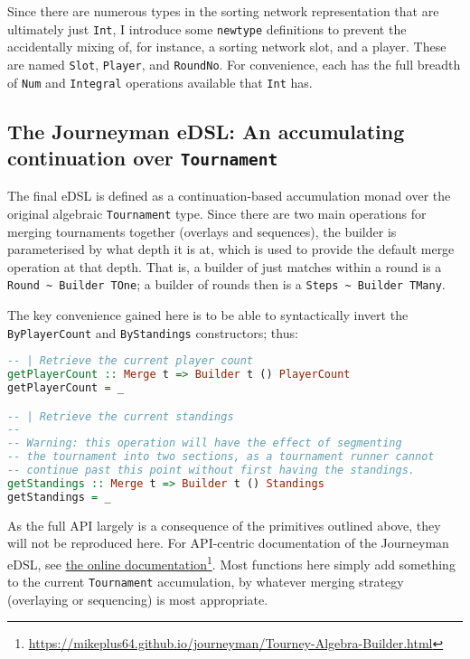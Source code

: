 \documentclass[a4,11pt,twoside,final,hidelinks]{article}
\begin{document}
Since there are numerous types in the sorting network representation that are
ultimately just \texttt{Int}, I introduce some \texttt{newtype} definitions to prevent the
accidentally mixing of, for instance, a sorting network slot, and a player.
These are named \texttt{Slot}, \texttt{Player}, and \texttt{RoundNo}. For convenience, each has the full
breadth of \texttt{Num} and \texttt{Integral} operations available that \texttt{Int} has.

\newpage
\subsection{The Journeyman eDSL: An accumulating continuation over \texttt{Tournament}}
\label{sec:org95bece4}

The final eDSL is defined as a continuation-based accumulation monad over the
original algebraic \texttt{Tournament} type. Since there are two main operations for
merging tournaments together (overlays and sequences), the builder is
parameterised by what depth it is at, which is used to provide the default merge
operation at that depth. That is, a builder of just matches within a round is a
\texttt{Round \textasciitilde{} Builder TOne}; a builder of rounds then is a \texttt{Steps \textasciitilde{} Builder TMany}.

The key convenience gained here is to be able to syntactically invert the
\texttt{ByPlayerCount} and \texttt{ByStandings} constructors; thus:

\begin{lstlisting}[language=haskell,numbers=none]
-- | Retrieve the current player count
getPlayerCount :: Merge t => Builder t () PlayerCount
getPlayerCount = _

-- | Retrieve the current standings
--
-- Warning: this operation will have the effect of segmenting
-- the tournament into two sections, as a tournament runner cannot
-- continue past this point without first having the standings.
getStandings :: Merge t => Builder t () Standings
getStandings = _
\end{lstlisting}

As the full API largely is a consequence of the primitives outlined above, they
will not be reproduced here. For API-centric documentation of the Journeyman
eDSL, see
\href{https://mikeplus64.github.io/journeyman/Tourney-Algebra-Builder.html}{ the online documentation}\footnote{\url{https://mikeplus64.github.io/journeyman/Tourney-Algebra-Builder.html}}. Most functions here simply add something to the current
\texttt{Tournament} accumulation, by whatever merging strategy (overlaying or
sequencing) is most appropriate.
\end{document}
